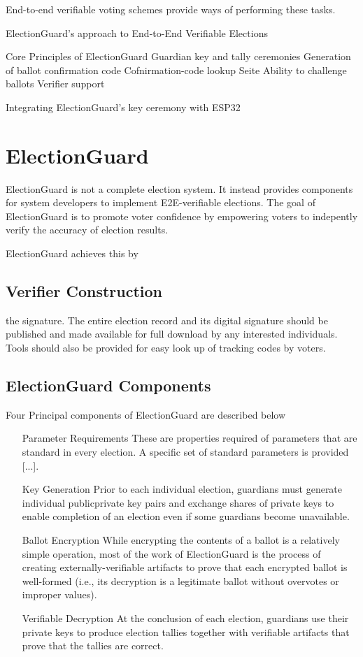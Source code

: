 End-to-end verifiable voting schemes provide ways of performing these tasks.


ElectionGuard's approach to End-to-End Verifiable Elections

Core Principles of ElectionGuard
Guardian key and tally ceremonies
Generation of ballot confirmation code
Cofnirmation-code lookup Seite
Ability to challenge ballots
Verifier support

Integrating ElectionGuard's key ceremony with ESP32


\section{ElectionGuard}


ElectionGuard is not a complete election system. It instead provides components for system developers to implement
E2E-verifiable elections. The goal of ElectionGuard is to promote voter confidence by empowering voters to
indepently verify the accuracy of election results. \cite[1]{eg-spec}



ElectionGuard achieves this by

\subsection{Verifier Construction}
the signature. The entire election record and its digital signature should be
\cite[25]{eg-spec}
published and made available for full download by any interested individuals. Tools should also be provided for easy
look up of tracking codes by voters.
\cite[25]{eg-spec}

\subsection{ElectionGuard Components}
Four Principal components of ElectionGuard are described below \cite[3-4]{eg-spec}
\begin{itemize}
    \item[Parameter Requirements] These are properties required of parameters that are standard in every election. A
          specific set of standard parameters is provided [...].
    \item[Key Generation] Prior to each individual election, guardians must generate individual publicprivate key
          pairs and exchange shares of private keys to enable completion of an election even if some guardians become
          unavailable.
    \item[Ballot Encryption] While encrypting the contents of a ballot is a relatively simple operation, most of the
          work of ElectionGuard is the process of creating externally-verifiable artifacts to prove that each
          encrypted ballot is well-formed (i.e., its decryption is a legitimate ballot without overvotes or improper values).
    \item[Verifiable Decryption]
          At the conclusion of each election, guardians use their private keys to produce election tallies
          together with verifiable artifacts that prove that the tallies are correct.
\end{itemize}

